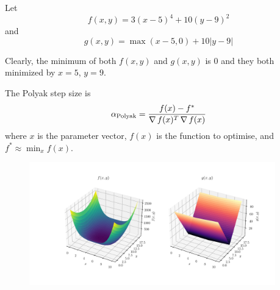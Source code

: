 
Let \begin{equation}
  f(x,y)=3(x-5)^4+10(y-9)^2
  \label{eq:f}
\end{equation}
and 
\begin{equation}
  g(x,y)=\max(x-5,0)+10|y-9|
  \label{eq:g}
\end{equation}


Clearly, the minimum of both $f(x,y)$ and $g(x,y)$ is $0$ and they both minimized by $x=5$, $y=9$.

The Polyak step size is \begin{equation}
  \alpha_{\text{Polyak}}=\frac{f(x)-f^*}{\operatorname*{\nabla} f(x)^T\operatorname*{\nabla} f(x)}
  \label{eq:polyak-step}
\end{equation}
where $x$ is the parameter vector, $f(x)$ is the function to optimise, and $f^*\approx\min_xf(x)$.

\begin{figure}
  \begin{center}
    \includegraphics[width=0.95\textwidth]{fig/f-g.pdf}
  \end{center}
  \caption{}\label{fig:f-and-g}
\end{figure}

